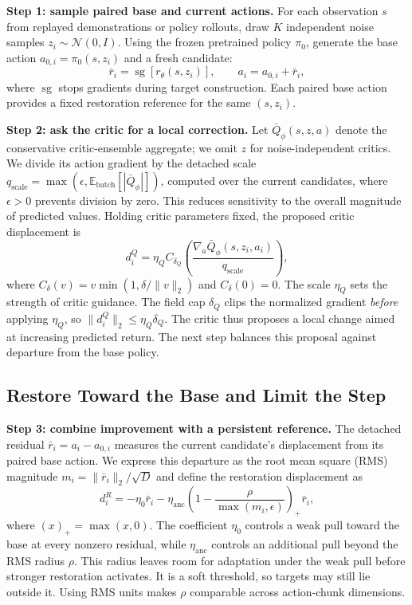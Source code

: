 \textbf{Step 1: sample paired base and current actions.}
For each observation $s$ from replayed demonstrations or policy rollouts, draw $K$ independent noise samples $z_i\sim\mathcal{N}(0,I)$. Using the frozen pretrained policy $\pi_0$, generate the base action $a_{0,i}=\pi_0(s,z_i)$ and a fresh candidate:
\begin{equation}
  \bar r_i=\operatorname{sg}[r_\theta(s,z_i)],
  \qquad a_i=a_{0,i}+\bar r_i,
  \label{eq:candidates}
\end{equation}
where $\operatorname{sg}$ stops gradients during target construction. Each paired base action provides a fixed restoration reference for the same $(s,z_i)$.

\textbf{Step 2: ask the critic for a local correction.}
Let $\bar Q_\phi(s,z,a)$ denote the conservative critic-ensemble aggregate; we omit $z$ for noise-independent critics. We divide its action gradient by the detached scale $q_{\mathrm{scale}}=\max(\epsilon,\mathbb{E}_{\mathrm{batch}}[|\bar Q_\phi|])$, computed over the current candidates, where $\epsilon>0$ prevents division by zero. This reduces sensitivity to the overall magnitude of predicted values. Holding critic parameters fixed, the proposed critic displacement is
\begin{equation}
  d_i^Q=\eta_Q C_{\delta_Q}\!\left(
  \frac{\nabla_a\bar Q_\phi(s,z_i,a_i)}{q_{\mathrm{scale}}}
  \right),
  \label{eq:reward-step}
\end{equation}
where $C_\delta(v)=v\min(1,\delta/\|v\|_2)$ and $C_\delta(0)=0$. The scale $\eta_Q$ sets the strength of critic guidance. The field cap $\delta_Q$ clips the normalized gradient \emph{before} applying $\eta_Q$, so $\|d_i^Q\|_2\leq\eta_Q\delta_Q$. The critic thus proposes a local change aimed at increasing predicted return. The next step balances this proposal against departure from the base policy.

\subsection{Restore Toward the Base and Limit the Step}
\label{sec:anchor}



\textbf{Step 3: combine improvement with a persistent reference.}
The detached residual $\bar r_i=a_i-a_{0,i}$ measures the current candidate's displacement from its paired base action. We express this departure as the root mean square (RMS) magnitude $m_i=\|\bar r_i\|_2/\sqrt{D}$ and define the restoration displacement as
\begin{equation}
d_i^R=-\eta_0\bar r_i
-\eta_{\mathrm{anc}}
\left(1-\frac{\rho}{\max(m_i,\epsilon)}\right)_{+}\bar r_i,
\label{eq:restoring-step}
\end{equation}
where $(x)_+=\max(x,0)$. The coefficient $\eta_0$ controls a weak pull toward the base at every nonzero residual, while $\eta_{\mathrm{anc}}$ controls an additional pull beyond the RMS radius $\rho$. This radius leaves room for adaptation under the weak pull before stronger restoration activates. It is a soft threshold, so targets may still lie outside it. Using RMS units makes $\rho$ comparable across action-chunk dimensions.

